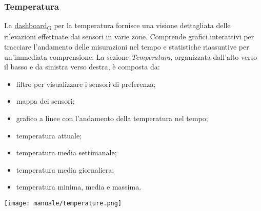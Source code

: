 \subsubsection{Temperatura}
La \href{https://7last.github.io/docs/pb/documentazione-interna/glossario\#dashboard}{dashboard\textsubscript{G}} per la temperatura fornisce una visione dettagliata delle rilevazioni effettuate dai sensori in varie zone. Comprende grafici interattivi per tracciare l'andamento delle misurazioni nel tempo e statistiche riassuntive per un'immediata comprensione. La sezione \textit{Temperatura}, organizzata dall'alto verso il basso e da sinistra verso destra, è composta da:
\begin{itemize}
    \item filtro per visualizzare i sensori di preferenza;
    \item mappa dei sensori;
    \item grafico a linee con l'andamento della temperatura nel tempo;
    \item temperatura attuale;
    \item temperatura media settimanale;
    \item temperatura media giornaliera;
    \item temperatura minima, media e massima.
\end{itemize}
\begin{center}
    \texttt{[image: manuale/temperature.png]}
\end{center}

\newpage
